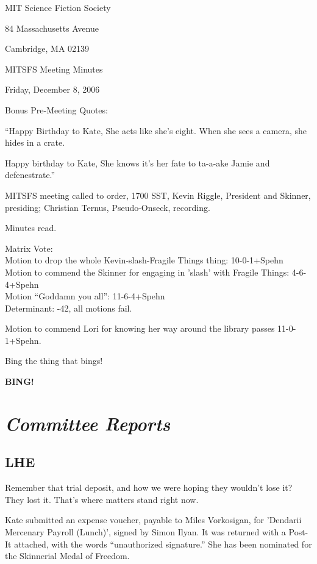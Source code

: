 \documentclass[10pt]{article}
\newcommand{\bing}{{\bf BING!} }
\newcommand{\goto}[1]{\bing \vskip 12pt \section*{{\em{#1}}}}
\begin{document}
\begin{center}

MIT Science Fiction Society

84 Massachusetts Avenue

Cambridge, MA 02139

\vspace{12pt}

MITSFS Meeting Minutes

Friday, December 8, 2006

\end{center}

\vspace{18pt}

\setlength{\parskip}{6pt}

\noindent
Bonus Pre-Meeting Quotes:

``Happy Birthday to Kate,
She acts like she's eight.
When she sees a camera,
she hides in a crate.

Happy birthday to Kate,
She knows it's her fate
to ta-a-ake Jamie
and defenestrate.''

MITSFS meeting called to order, 1700 SST,
Kevin Riggle, President and Skinner, presiding; Christian Ternus, Pseudo-Onseck, recording.

Minutes read.

Matrix Vote:\\
Motion to drop the whole Kevin-slash-Fragile Things thing: 10-0-1+Spehn\\
Motion to commend the Skinner for engaging in 'slash' with Fragile Things: 4-6-4+Spehn\\
Motion ``Goddamn you all'': 11-6-4+Spehn\\

Determinant: -42, all motions fail.

Motion to commend Lori for knowing her way around the library passes 11-0-1+Spehn.

Bing the thing that bings!

\goto{Committee Reports}

\subsection*{LHE}
Remember that trial deposit, and how we were hoping they wouldn't lose it? They lost it. That's where matters stand right now.

Kate submitted an expense voucher, payable to Miles Vorkosigan, for 'Dendarii Mercenary Payroll (Lunch)', signed by Simon Ilyan. It was returned with a Post-It attached, with the words ``unauthorized signature.'' She has been nominated for the Skinnerial Medal of Freedom.
\end{document}
